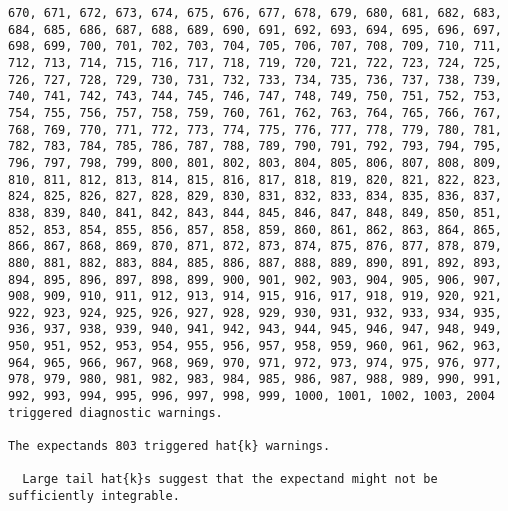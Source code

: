 \documentclass[
  letterpaper,
  DIV=11,
  numbers=noendperiod]{scrartcl}
\begin{document}
\begin{verbatim}
670, 671, 672, 673, 674, 675, 676, 677, 678, 679, 680, 681, 682, 683, 684, 685, 686, 687, 688, 689, 690, 691, 692, 693, 694, 695, 696, 697, 698, 699, 700, 701, 702, 703, 704, 705, 706, 707, 708, 709, 710, 711, 712, 713, 714, 715, 716, 717, 718, 719, 720, 721, 722, 723, 724, 725, 726, 727, 728, 729, 730, 731, 732, 733, 734, 735, 736, 737, 738, 739, 740, 741, 742, 743, 744, 745, 746, 747, 748, 749, 750, 751, 752, 753, 754, 755, 756, 757, 758, 759, 760, 761, 762, 763, 764, 765, 766, 767, 768, 769, 770, 771, 772, 773, 774, 775, 776, 777, 778, 779, 780, 781, 782, 783, 784, 785, 786, 787, 788, 789, 790, 791, 792, 793, 794, 795, 796, 797, 798, 799, 800, 801, 802, 803, 804, 805, 806, 807, 808, 809, 810, 811, 812, 813, 814, 815, 816, 817, 818, 819, 820, 821, 822, 823, 824, 825, 826, 827, 828, 829, 830, 831, 832, 833, 834, 835, 836, 837, 838, 839, 840, 841, 842, 843, 844, 845, 846, 847, 848, 849, 850, 851, 852, 853, 854, 855, 856, 857, 858, 859, 860, 861, 862, 863, 864, 865, 866, 867, 868, 869, 870, 871, 872, 873, 874, 875, 876, 877, 878, 879, 880, 881, 882, 883, 884, 885, 886, 887, 888, 889, 890, 891, 892, 893, 894, 895, 896, 897, 898, 899, 900, 901, 902, 903, 904, 905, 906, 907, 908, 909, 910, 911, 912, 913, 914, 915, 916, 917, 918, 919, 920, 921, 922, 923, 924, 925, 926, 927, 928, 929, 930, 931, 932, 933, 934, 935, 936, 937, 938, 939, 940, 941, 942, 943, 944, 945, 946, 947, 948, 949, 950, 951, 952, 953, 954, 955, 956, 957, 958, 959, 960, 961, 962, 963, 964, 965, 966, 967, 968, 969, 970, 971, 972, 973, 974, 975, 976, 977, 978, 979, 980, 981, 982, 983, 984, 985, 986, 987, 988, 989, 990, 991, 992, 993, 994, 995, 996, 997, 998, 999, 1000, 1001, 1002, 1003, 2004 triggered diagnostic warnings.

The expectands 803 triggered hat{k} warnings.

  Large tail hat{k}s suggest that the expectand might not be sufficiently integrable.



\end{verbatim}
\end{document}
